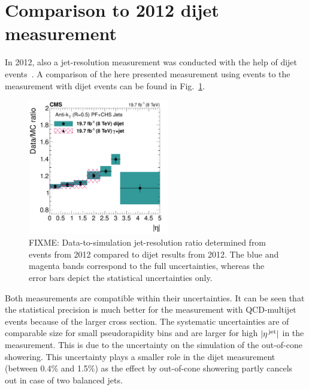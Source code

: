 \section{Comparison to 2012 dijet measurement}
\label{res:sec:comparison_2012}
In 2012, also a jet-\pt resolution measurement was conducted with the help of dijet events~\cite{bib:CMS:JME_PAS,bib:Kristin_Thesis}.
A comparison of the here presented measurement using \GAMJET events to the measurement with dijet events can be found in Fig.~\ref{res:fig:Comparison_2012}.
\begin{figure}[!t]
 \centering
    \includegraphics[width=0.55\textwidth]{figures/resolution/results/JER_2012_compPhoton_final_v2.pdf}
  \caption{FIXME: Data-to-simulation jet-\pt resolution ratio determined from \GAMJET events from 2012 compared to dijet results from 2012.
           The blue and magenta bands correspond to the full uncertainties, whereas the error bars depict the statistical uncertainties only.}
  \label{res:fig:Comparison_2012}
\end{figure}
Both measurements are compatible within their uncertainties.
It can be seen that the statistical precision is much better for the measurement with QCD-multijet events because of the larger cross section.
The systematic uncertainties are of comparable size for small pseudorapidity bins and are larger for high $|{\eta}^{\text{\,jet}}|$ in the \GAMJET measurement.
This is due to the uncertainty on the simulation of the out-of-cone showering.
This uncertainty plays a smaller role in the dijet measurement (between 0.4\% and 1.5\%) as the effect by out-of-cone showering partly cancels out in case of two balanced jets.

